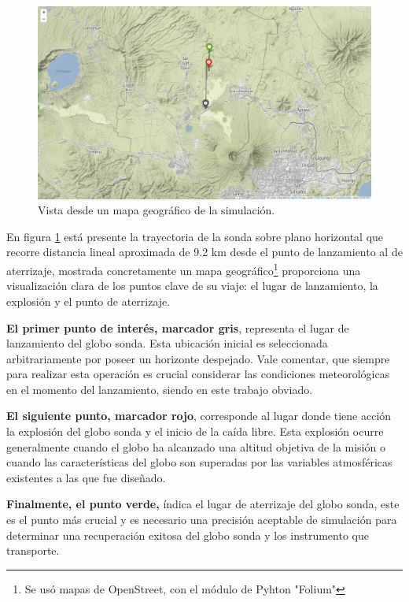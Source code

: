 \newpage

\begin{figure}[ht]
    \centering
    \includegraphics[width=0.9\linewidth]{document/figures/03_mapa.png}
    \caption{Vista desde un mapa geográfico de la simulación.}
    \label{fig:mapa}
\end{figure}

En figura \ref{fig:mapa} está presente la trayectoria de la sonda sobre plano horizontal que recorre distancia lineal aproximada de 9.2 km desde el punto de lanzamiento al de aterrizaje, mostrada concretamente un mapa geográfico\footnote{Se usó mapas de OpenStreet, con el módulo de Pyhton "Folium"} proporciona una visualización clara de los puntos clave de su viaje: el lugar de lanzamiento, la explosión  y el punto de aterrizaje.

\textbf{El primer punto de interés,  marcador gris}, representa el lugar de lanzamiento del globo sonda. Esta ubicación inicial es seleccionada arbitrariamente por poseer un horizonte despejado. Vale comentar, que siempre para realizar esta operación es crucial considerar las condiciones meteorológicas en el momento del lanzamiento, siendo en este trabajo obviado.

\textbf{El siguiente punto, marcador rojo}, corresponde al lugar donde tiene acción  la explosión del globo sonda y el inicio de la caída libre. Esta explosión ocurre generalmente cuando el globo ha alcanzado una altitud objetiva de la misión o cuando las características del globo son superadas por las variables atmosféricas existentes a las que fue diseñado. 

\textbf{Finalmente, el punto verde,}  índica el lugar de aterrizaje del globo sonda, este es el punto más crucial y es necesario una precisión aceptable de simulación para determinar una recuperación exitosa del globo sonda y los instrumento que transporte.

